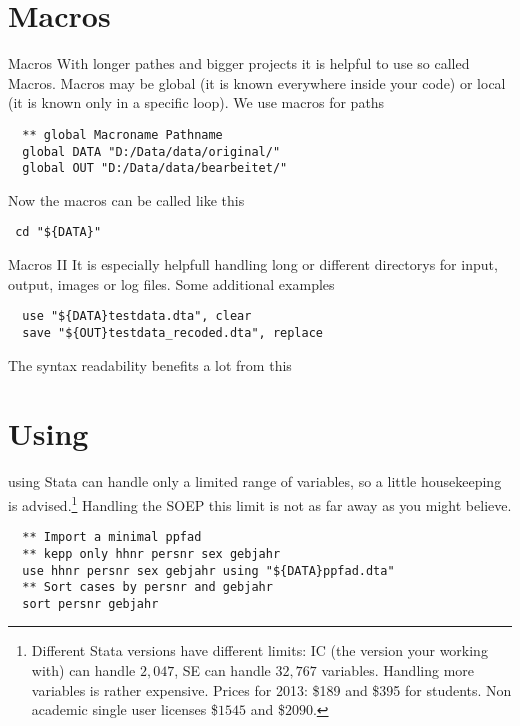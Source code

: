 \section{Macros}
\begin{frame}[fragile]{Macros}  
With longer pathes and bigger projects it is helpful to use so called Macros. Macros may be global (it is known everywhere inside your code) or local (it is known only in a specific loop). We use macros for paths
\begin{lstlisting}
  ** global Macroname Pathname
  global DATA "D:/Data/data/original/"
  global OUT "D:/Data/data/bearbeitet/"
\end{lstlisting}
Now the macros can be called like this
\begin{lstlisting}
 cd "${DATA}"
\end{lstlisting}

\end{frame}

\begin{frame}[fragile]{Macros II}
It is especially helpfull handling long or different directorys for input, output, images or log files. Some additional examples 
\begin{lstlisting}
  use "${DATA}testdata.dta", clear
  save "${OUT}testdata_recoded.dta", replace
\end{lstlisting}
The syntax readability benefits a lot from this


\end{frame}

\section{Using}
\begin{frame}[fragile]{using}  
Stata can handle only a limited range of variables, so a little housekeeping is advised.\footnote{Different Stata versions have different limits: IC (the version your working with) can handle $2,047$, SE can handle $32,767$ variables. Handling more variables is rather expensive. Prices for 2013: \$189 and \$395 for students. Non academic single user licenses \$$1545$ and \$$2090$.} Handling the SOEP this limit is not as far away as you might believe.
\begin{lstlisting}
  ** Import a minimal ppfad
  ** kepp only hhnr persnr sex gebjahr
  use hhnr persnr sex gebjahr using "${DATA}ppfad.dta"
  ** Sort cases by persnr and gebjahr
  sort persnr gebjahr
\end{lstlisting}
\end{frame}

